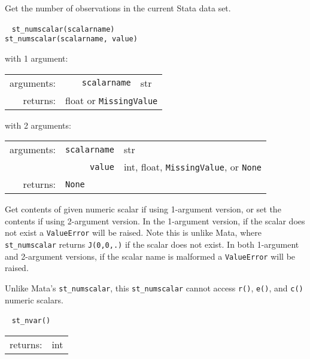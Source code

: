 \documentclass{article}
\begin{document}
			\vspace{1.5mm}
			\noindent Get the number of observations in the current Stata data set. \newline
			
			
			\ \newline
			\noindent \lstinline$st_numscalar(scalarname)$ \\
			\noindent \lstinline$st_numscalar(scalarname, value)$
								
			\vspace{1.5mm}
			\noindent 
			\indent with 1 argument:
			
			\indent \qquad \begin{tabular}{rrl}
					arguments: & \texttt{scalarname} & str \\
					returns: & \multicolumn{2}{l}{float or \lstinline$MissingValue$}
				\end{tabular}
								
			\vspace{1.5mm}
			\noindent 
			\indent with 2 arguments:
			
			\indent \qquad \begin{tabular}{rrl}
					arguments: & \texttt{scalarname} & str \\
					  & \texttt{value} & int, float, \lstinline$MissingValue$, or \texttt{None} \\
					returns: & \multicolumn{2}{l}{\texttt{None}}
				\end{tabular}
								
			\vspace{1.5mm}
			\noindent Get contents of given numeric scalar if using 1-argument version, or set the contents if using 2-argument version. In the 1-argument version, if the scalar does not exist a \lstinline{ValueError} will be raised. Note this is unlike Mata, where \lstinline{st_numscalar} returns \lstinline{J(0,0,.)} if the scalar does not exist. In both 1-argument and 2-argument versions, if the scalar name is malformed a \lstinline{ValueError} will be raised. 
			
			Unlike Mata's \lstinline{st_numscalar}, this \lstinline{st_numscalar} cannot access \lstinline{r()}, \lstinline{e()}, and \lstinline{c()} numeric scalars. \newline
			
			
			\ \newline
			\noindent \lstinline$st_nvar()$
								
			\vspace{1.5mm}
			\noindent 
			\indent \begin{tabular}{rl}
					returns: & int
				\end{tabular}
								
\end{document}
